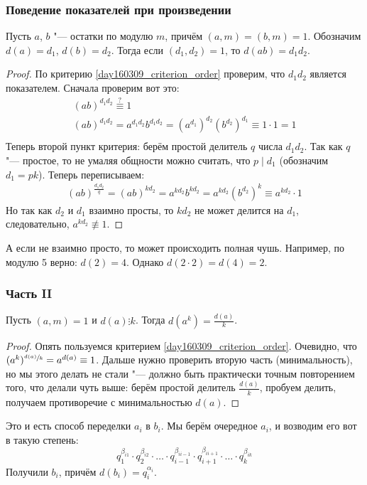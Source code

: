 	\subsubsection{Поведение показателей при произведении}
		\begin{lemma}
			Пусть $a$, $b$ "--- остатки по модулю $m$, причём $(a, m)=(b, m)=1$.
			Обозначим $d(a)=d_1$, $d(b)=d_2$.
			Тогда если $(d_1, d_2)=1$, то $d(ab)=d_1d_2$.
		\end{lemma}
		\begin{proof}
			По критерию \ref{day160309_criterion_order} проверим, что $d_1d_2$ является показателем.
			Сначала проверим вот это:
			\begin{gather*}
				(ab)^{d_1d_2} \stackrel{?}{\equiv} 1 \\
				(ab)^{d_1d_2} = a^{d_1d_2}b^{d_1d_2} = (a^{d_1})^{d_2}(b^{d_2})^{d_1} \equiv 1 \cdot 1 = 1 \\
			\end{gather*}
			Теперь второй пункт критерия: берём простой делитель $q$ числа $d_1d_2$.
			Так как $q$ "--- простое, то не умаляя общности можно считать, что $p\mid d_1$
			(обозначим $d_1=pk$).
			Теперь переписываем:
			\begin{gather*}
				(ab)^{\frac{d_1d_2}q} =
				(ab)^{kd_2} =
				a^{kd_2} b^{kd_2} =
				a^{kd_2} \left(b^{d_2}\right)^{k} \equiv
				a^{kd_2} \cdot 1
			\end{gather*}
			Но так как $d_2$ и $d_1$ взаимно просты, то $kd_2$ не может делится на $d_1$,
			следовательно, $a^{kd_2} \nequiv 1$.
		\end{proof}
		\begin{Rem}
			А если не взаимно просто, то может происходить полная чушь.
			Например, по модулю 5 верно: $d(2)=4$.
			Однако $d(2\cdot 2)=d(4)=2$.
		\end{Rem}

	\subsubsection{Часть II}
		\begin{lemma}
			Пусть $(a, m)=1$ и $d(a)\vdots k$.
			Тогда $d(a^k) = \frac{d(a)}{k}$.
		\end{lemma}
		\begin{proof}
			Опять пользуемся критерием \ref{day160309_criterion_order}.
			Очевидно, что $(a^k)^{\sfrac{d(a)}{k}} = a^{d(a)} \equiv 1$.
			Дальше нужно проверить вторую часть (минимальность), но мы этого делать
			не стали "--- должно быть практически точным повторением того, что делали чуть выше:
			берём простой делитель $\frac{d(a)}{k}$, пробуем делить, получаем противоречие с минимальностью
			$d(a)$.
		\end{proof}
		Это и есть способ переделки $a_i$ в $b_i$.
		Мы берём очередное $a_i$, и возводим его вот в такую степень:
		\[
			q_1^{\beta_{i1}} \cdot
			q_2^{\beta_{i2}} \cdot
			\dots \cdot
			q_{i-1}^{\beta_{i{i-1}}} \cdot
			q_{i+1}^{\beta_{i{i+1}}} \cdot
			\dots \cdot
			q_k^{\beta_{ik}} \]
		Получили $b_i$, причём $d(b_i)=q_i^{\alpha_i}$.

